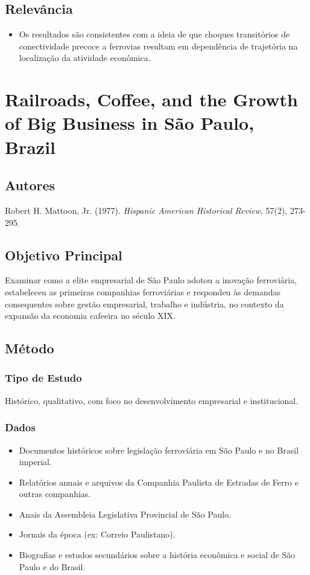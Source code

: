 \documentclass[12pt]{article}
\begin{document}
\subsection*{Relevância}
\begin{itemize}
    \item Os resultados são consistentes com a ideia de que choques transitórios de conectividade precoce a ferrovias resultam em dependência de trajetória na localização da atividade econômica.
\end{itemize}

\newpage

\section{Railroads, Coffee, and the Growth of Big Business in São Paulo, Brazil}

\subsection*{Autores}
Robert H. Mattoon, Jr. (1977). \textit{Hispanic American Historical Review}, 57(2), 273-295.

\subsection*{Objetivo Principal}
Examinar como a elite empresarial de São Paulo adotou a inovação ferroviária, estabeleceu as primeiras companhias ferroviárias e respondeu às demandas consequentes sobre gestão empresarial, trabalho e indústria, no contexto da expansão da economia cafeeira no século XIX.

\subsection*{Método}

\subsubsection*{Tipo de Estudo}
Histórico, qualitativo, com foco no desenvolvimento empresarial e institucional.

\subsubsection*{Dados}
\begin{itemize}
    \item Documentos históricos sobre legislação ferroviária em São Paulo e no Brasil imperial.
    \item Relatórios anuais e arquivos da Companhia Paulista de Estradas de Ferro e outras companhias.
    \item Anais da Assembleia Legislativa Provincial de São Paulo.
    \item Jornais da época (ex: Correio Paulistano).
    \item Biografias e estudos secundários sobre a história econômica e social de São Paulo e do Brasil.
\end{itemize}
\end{document}

